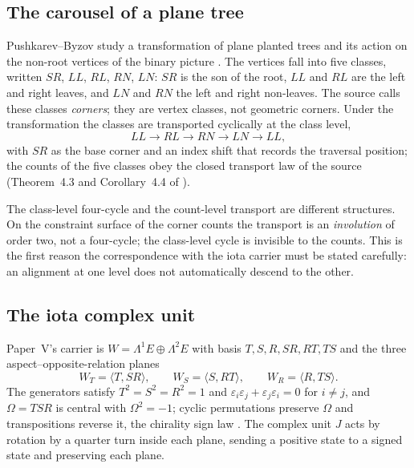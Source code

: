 
\subsection{The carousel of a plane tree}

Pushkarev--Byzov study a transformation of plane planted trees and its action on the
non-root vertices of the binary picture \cite{PushkarevByzov2014}.  The vertices fall
into five classes, written $SR$, $LL$, $RL$, $RN$, $LN$: $SR$ is the son of the root,
$LL$ and $RL$ are the left and right leaves, and $LN$ and $RN$ the left and right
non-leaves.  The source calls these classes \emph{corners}; they are vertex classes,
not geometric corners.  Under the
transformation the classes are transported cyclically at the class level,
\[
LL\longrightarrow RL\longrightarrow RN\longrightarrow LN\longrightarrow LL,
\]
with $SR$ as the base corner and an index shift that records the traversal position;
the counts of the five classes obey the closed transport law of the source
(Theorem~4.3 and Corollary~4.4 of \cite{PushkarevByzov2014}).

\begin{remark}\label{rem:two-levels}
The class-level four-cycle and the count-level transport are different structures.  On
the constraint surface of the corner counts the transport is an \emph{involution} of
order two, not a four-cycle; the class-level cycle is invisible to the counts.  This
is the first reason the correspondence with the iota carrier must be stated carefully:
an alignment at one level does not automatically descend to the other.
\end{remark}

\subsection{The iota complex unit}

Paper~V's carrier is $W=\Lambda^{1}E\oplus\Lambda^{2}E$ with basis
$T,S,R,SR,RT,TS$ and the three aspect--opposite-relation planes
\[
W_T=\langle T,SR\rangle,\qquad W_S=\langle S,RT\rangle,\qquad W_R=\langle R,TS\rangle .
\]
The generators satisfy $T^{2}=S^{2}=R^{2}=1$ and $\varepsilon_i\varepsilon_j+
\varepsilon_j\varepsilon_i=0$ for $i\neq j$, and $\Omega=TSR$ is central with
$\Omega^{2}=-1$; cyclic permutations preserve $\Omega$ and transpositions reverse it,
the chirality sign law \cite{Yuan2026AEGPaperFive}.  The complex unit $J$ acts by
rotation by a quarter turn inside each plane, sending a positive state to a signed
state and preserving each plane.

